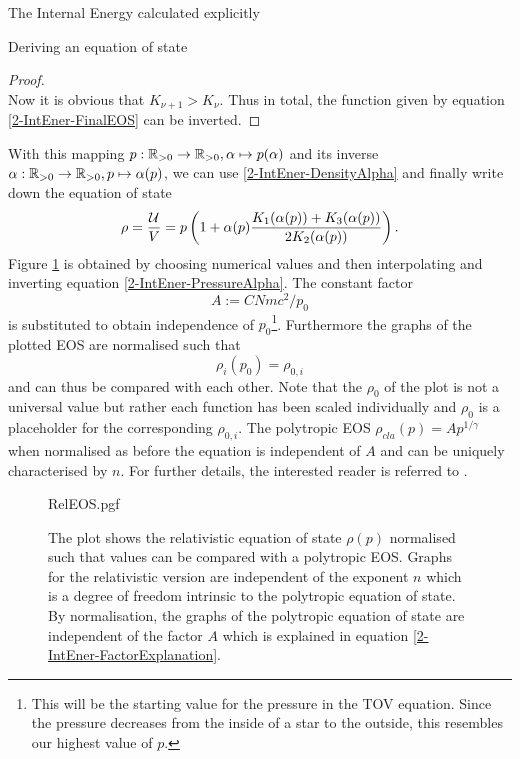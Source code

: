 \begin{section}{The Internal Energy calculated explicitly}
\begin{subsection}{Deriving an equation of state}
\begin{proof}
\begin{equation}
	\end{equation}
	Now it is obvious that $K_{\nu+1}>K_\nu$. Thus in total, the function given by equation \ref{2-IntEner-FinalEOS} can be inverted.
\end{proof}%
%
%
\noindent With this mapping $p:\mathbb{R}_{>0}\rightarrow \mathbb{R}_{>0},\alpha\mapsto p(\alpha)$ and its inverse $\alpha:\mathbb{R}_{>0}\rightarrow \mathbb{R}_{>0},p\mapsto \alpha(p)$, we can use \ref{2-IntEner-DensityAlpha} and finally write down the equation of state 
\begin{equation}
	\rho = \frac{\mathcal{U}}{V} = p\left(1+\alpha(p)\frac{K_1(\alpha(p))+K_3(\alpha(p))}{2K_2(\alpha(p))}\right).
	\label{2-IntEner-FinalEOS}
\end{equation}
Figure \ref{2-IntEner-RelEOSPlot} is obtained by choosing numerical values and then interpolating and inverting equation \ref{2-IntEner-PressureAlpha}. The constant factor 
\begin{equation}
	A:=CNmc^2/p_0
	\label{2-IntEner-FactorExplanation}
\end{equation}
is substituted to obtain independence of $p_0$\footnote{This will be the starting value for the pressure in the TOV equation. Since the pressure decreases from the inside of a star to the outside, this resembles our highest value of $p$.}. Furthermore the graphs of the plotted EOS are normalised such that
\begin{equation}
	\rho_{i}(p_0)=\rho_{0,i}
\end{equation}
and can thus be compared with each other. Note that the $\rho_0$ of the plot is not a universal value but rather each function has been scaled individually and $\rho_0$ is a placeholder for the corresponding $\rho_{0,i}$. The polytropic EOS $\rho_{cla}(p)=Ap^{1/\gamma}$ when normalised as before the equation is independent of $A$ and can be uniquely characterised by $n$. For further details, the interested reader is referred to \cite{pleyerGithubRepositoryJonas}.
\begin{figure}[H]
	\centering
	{RelEOS.pgf}
	\caption[Relativistic Equation of State]{The plot shows the relativistic equation of state $\rho(p)$ normalised such that values can be compared with a polytropic EOS. Graphs for the relativistic version are independent of the exponent $n$ which is a degree of freedom intrinsic to the polytropic equation of state. By normalisation, the graphs of the polytropic equation of state are independent of the factor $A$ which is explained in equation \ref{2-IntEner-FactorExplanation}.}
	\label{2-IntEner-RelEOSPlot}
\end{figure}
\end{subsection}
%
%
\end{section}
